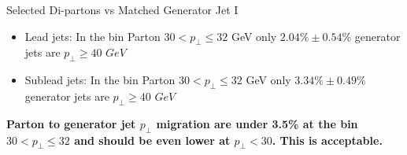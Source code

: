 \documentclass[8pt]{beamer}
\begin{document}
\begin{frame}{Selected Di-partons vs Matched Generator Jet I}
\begin{itemize}
  \item \tiny{Lead jets: In the bin Parton $30<p_\perp\leq32$ GeV only $2.04\% \pm 0.54\%$ generator jets are $p_\perp\geq40$ $GeV$}
  \item \tiny{Sublead jets: In the bin Parton $30<p_\perp\leq32$ GeV only $3.34\% \pm 0.49\%$ generator jets are $p_\perp\geq40$ $GeV$}
\end{itemize}

\begin{center}
\textbf{Parton to generator jet $p_\perp$ migration are under 3.5\% at the bin $30<p_\perp\leq32$ and should be even lower at $p_\perp<30$. This is acceptable.}
\end{center}

\end{frame}
\end{document}
